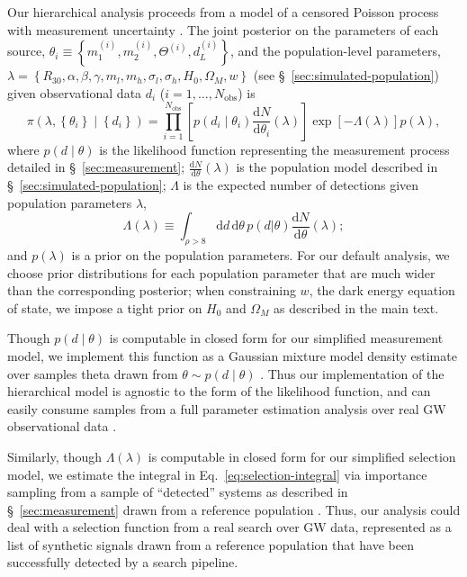 \documentclass[modern]{aastex62}
\newcommand{\dd}{\mathrm{d}}
\newcommand{\diff}[2]{\frac{\dd #1}{\dd #2}}
\begin{document}
Our hierarchical analysis proceeds from a model of a censored Poisson process
with measurement uncertainty \citep{Loredo2004,Mandel2019}.  The joint posterior
on the parameters of each source, $\theta_i \equiv \left\{ m_1^{(i)}, m_2^{(i)},
\Theta^{(i)}, d_L^{(i)} \right\}$, and the population-level parameters, $\lambda
= \left\{ R_{30}, \alpha, \beta, \gamma, m_l, m_h, \sigma_l, \sigma_h, H_0,
\Omega_M, w \right\}$ (see \S\ \ref{sec:simulated-population}) given
observational data $d_i$ ($i = 1, \ldots, N_\mathrm{obs}$) is
%
\begin{equation}
  \label{eq:hierarchical-model}
  \pi \left( \lambda, \left\{ \theta_i \right\} \mid \left\{ d_i \right\} \right) = \prod_{i=1}^{N_\mathrm{obs}} \left[ p\left( d_i \mid \theta_i \right) \diff{N}{\theta_i}(\lambda) \right] \exp\left[ - \Lambda(\lambda) \right] p\left( \lambda \right),
\end{equation}
%
where $p\left( d \mid \theta \right)$ is the likelihood function representing
the measurement process detailed in \S\ \ref{sec:measurement};
$\diff{N}{\theta}(\lambda)$ is the population model described in \S\
\ref{sec:simulated-population}; $\Lambda$ is the expected number of detections
given population parameters $\lambda$,
%
\begin{equation}
  \label{eq:selection-integral}
  \Lambda(\lambda) \equiv \int_{\rho > 8} \dd d \, \dd \theta \, p\left( d | \theta \right) \diff{N}{\theta}\left(\lambda \right);
\end{equation}
%
and $p(\lambda)$ is a prior on the population parameters.  For our default
analysis, we choose prior distributions for each population parameter that are
much wider than the corresponding posterior; when constraining $w$, the dark
energy equation of state, we impose a tight prior on $H_0$ and $\Omega_M$ as
described in the main text.

Though $p\left( d \mid \theta \right)$ is computable in closed form for our
simplified measurement model, we implement this function as a Gaussian mixture
model density estimate over samples theta drawn from $\theta \sim p\left( d \mid
\theta \right)$ \citep{SciKitLearn}.  Thus our implementation of the
hierarchical model is agnostic to the form of the likelihood function, and can
easily consume samples from a full parameter estimation analysis over real
\ac{GW} observational data \citep{GWTC-1}.

Similarly, though $\Lambda(\lambda)$ is computable in closed form for our
simplified selection model, we estimate the integral in Eq.\
\eqref{eq:selection-integral} via importance sampling from a sample of
``detected'' systems as described in \S\ \ref{sec:measurement} drawn from a
reference population \citep{Farr2019}.  Thus, our analysis could deal with a
selection function from a real search over \ac{GW} data, represented as a list
of synthetic signals drawn from a reference population that have been
successfully detected by a search pipeline.
\end{document}

